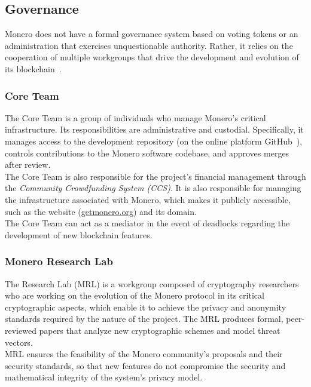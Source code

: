 \documentclass[conference]{IEEEtran}
\begin{document}
\subsection{Governance}
Monero does not have a formal governance system based on voting tokens or an administration that exercises unquestionable authority. Rather, it relies on the cooperation of multiple workgroups that drive the development and evolution of its blockchain~\cite{monero_workgroups}.
\subsubsection{Core Team}
The Core Team is a group of individuals who manage Monero's critical infrastructure. Its responsibilities are administrative and custodial. Specifically, it manages access to the development repository (on the online platform GitHub~\cite{monero_repo}), controls contributions to the Monero software codebase, and approves merges after review.\\
The Core Team is also responsible for the project's financial management through the \textit{Community Crowdfunding System (CCS)}.
It is also responsible for managing the infrastructure associated with Monero, which makes it publicly accessible, such as the website (\href{https://www.getmonero.org}{getmonero.org}) and its domain.\\
The Core Team can act as a mediator in the event of deadlocks regarding the development of new blockchain features.

\subsubsection{Monero Research Lab}
The Research Lab (MRL) is a workgroup composed of cryptography researchers who are working on the evolution of the Monero protocol in its critical cryptographic aspects, which enable it to achieve the privacy and anonymity standards required by the nature of the project. The MRL produces formal, peer-reviewed papers that analyze new cryptographic schemes and model threat vectors.\\
MRL ensures the feasibility of the Monero community's proposals and their security standards, so that new features do not compromise the security and mathematical integrity of the system's privacy model.
\end{document}
